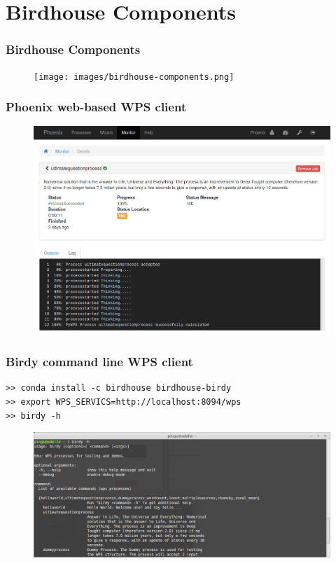 \documentclass{beamer}
\begin{document}
  \section{Birdhouse Components}


  \begin{frame}[plain]
    \frametitle{Birdhouse Components}
    \begin{figure}
      \begin{center}
        \texttt{[image: images/birdhouse-components.png]}
      \end{center}
    \end{figure}
  \end{frame}


  \begin{frame}
    \frametitle{Phoenix web-based WPS client}
    \begin{figure}
      \includegraphics[width=11.5cm]{images/phoenix.png}
    \end{figure}
  \end{frame}


  \begin{frame}[fragile]
    \frametitle{Birdy command line WPS client}
    \begin{verbatim}
>> conda install -c birdhouse birdhouse-birdy
>> export WPS_SERVICS=http://localhost:8094/wps
>> birdy -h
    \end{verbatim}
    \begin{figure}
      \includegraphics[width=11.5cm]{images/birdy-terminal.png}
    \end{figure}
\end{frame}
\end{document}
